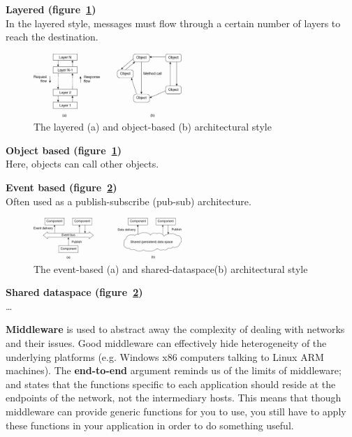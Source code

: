 
\begin{description}
  \item \textbf{Layered (figure~\ref{layered})}\\
    In the layered style, messages must flow through a certain number of layers
    to reach the destination.
    \begin{figure}[H]
      \centering
      \includegraphics[width=0.5\textwidth]{images/layered}
      \caption{The layered (a) and object-based (b) architectural style}
      \label{layered}
    \end{figure}
  \item \textbf{Object based (figure~\ref{layered})}\\
    Here, objects can call other objects.
  \item \textbf{Event based (figure~\ref{event-based})}\\
    Often used as a publish-subscribe (pub-sub) architecture.
    \begin{figure}[H]
      \centering
      \includegraphics[width=0.5\textwidth]{images/event-based}
      \caption{The event-based (a) and shared-dataspace(b) architectural style}
      \label{event-based}
    \end{figure}
  \item \textbf{Shared dataspace (figure~\ref{event-based})}\\
    \dots
\end{description}

\textbf{Middleware} is used to abstract away the complexity of dealing with
networks and their issues. Good middleware can effectively hide heterogeneity of
the underlying platforms (e.g. Windows x86 computers talking to Linux ARM
machines). The \textbf{end-to-end} argument reminds us of the limits of
middleware; and states that the functions specific to each application should
reside at the endpoints of the network, not the intermediary hosts. This means
that though middleware can provide generic functions for you to use, you still
have to apply these functions in your application in order to do something
useful.

